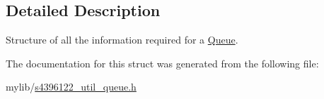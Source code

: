 \subsection{Detailed Description}
Structure of all the information required for a \hyperlink{structQueue}{Queue}. 

The documentation for this struct was generated from the following file\+:\begin{DoxyCompactItemize}
\item 
mylib/\hyperlink{s4396122__util__queue_8h}{s4396122\+\_\+util\+\_\+queue.\+h}\end{DoxyCompactItemize}
